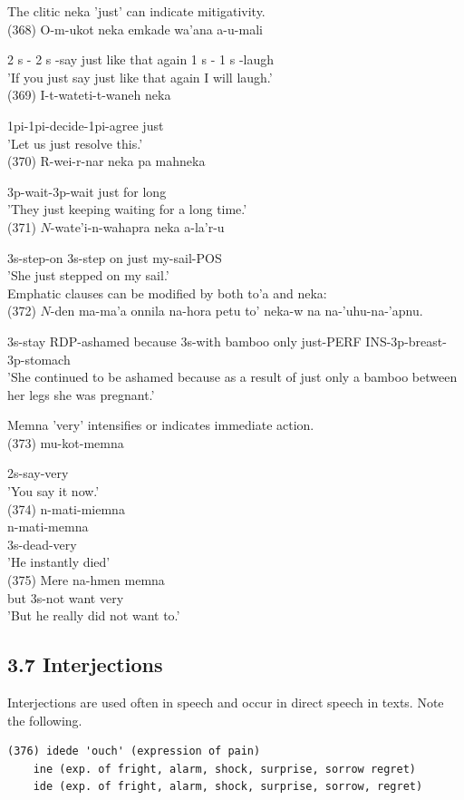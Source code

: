 \documentclass[10pt]{article}
\begin{document}
The clitic neka 'just' can indicate mitigativity.\\
(368) O-m-ukot neka emkade wa'ana a-u-mali

2 s - 2 s -say just like that again 1 s - 1 s -laugh\\
'If you just say just like that again I will laugh.'\\
(369) I-t-wateti-t-waneh neka

1pi-1pi-decide-1pi-agree just\\
'Let us just resolve this.'\\
(370) R-wei-r-nar neka pa mahneka

3p-wait-3p-wait just for long\\
'They just keeping waiting for a long time.'\\
(371) \(N\)-wate'i-n-wahapra neka a-la'r-u

3s-step-on 3s-step on just my-sail-POS\\
'She just stepped on my sail.'\\
Emphatic clauses can be modified by both to'a and neka:\\
(372) \(N\)-den ma-ma'a onnila na-hora petu to' neka-w na na-'uhu-na-'apnu.

3s-stay RDP-ashamed because 3s-with bamboo only just-PERF INS-3p-breast-3p-stomach\\
'She continued to be ashamed because as a result of just only a bamboo between her legs she was pregnant.'

Memna 'very' intensifies or indicates immediate action.\\
(373) mu-kot-memna

2s-say-very\\
'You say it now.'\\
(374) n-mati-miemna\\
n-mati-memna\\
3s-dead-very\\
'He instantly died'\\
(375) Mere na-hmen memna\\
but 3s-not want very\\
'But he really did not want to.'

\subsection*{3.7 Interjections}
Interjections are used often in speech and occur in direct speech in texts. Note the following.

\begin{verbatim}
(376) idede 'ouch' (expression of pain)
    ine (exp. of fright, alarm, shock, surprise, sorrow regret)
    ide (exp. of fright, alarm, shock, surprise, sorrow, regret)
\end{verbatim}
\end{document}
